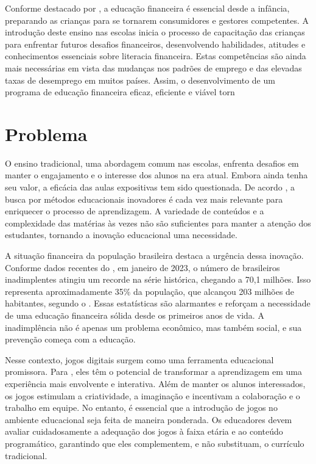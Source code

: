 Conforme destacado por \cite{masnan2016financial}, a educação financeira é essencial desde a infância, preparando as crianças para se tornarem consumidores e gestores competentes. A introdução deste ensino nas escolas inicia o processo de capacitação das crianças para enfrentar futuros desafios financeiros, desenvolvendo habilidades, atitudes e conhecimentos essenciais sobre literacia financeira. Estas competências são ainda mais necessárias em vista das mudanças nos padrões de emprego e das elevadas taxas de desemprego em muitos países. Assim, o desenvolvimento de um programa de educação financeira eficaz, eficiente e viável torn


\section{Problema}

O ensino tradicional, uma abordagem comum nas escolas, enfrenta desafios em manter o engajamento e o interesse dos alunos na era atual. Embora ainda tenha seu valor, a eficácia das aulas expositivas tem sido questionada. De acordo \cite{fortes2023aprendizagem}, a busca por métodos educacionais inovadores é cada vez mais relevante para enriquecer o processo de aprendizagem. A variedade de conteúdos e a complexidade das matérias às vezes não são suficientes para manter a atenção dos estudantes, tornando a inovação educacional uma necessidade.

A situação financeira da população brasileira destaca a urgência dessa inovação. Conforme dados recentes do \cite{SERASA_2023}, em janeiro de 2023, o número de brasileiros inadimplentes atingiu um recorde na série histórica, chegando a 70,1 milhões. Isso representa aproximadamente 35\% da população, que alcançou 203 milhões de habitantes, segundo o \cite{IBGE_Censo_2022}. Essas estatísticas são alarmantes e reforçam a necessidade de uma educação financeira sólida desde os primeiros anos de vida. A inadimplência não é apenas um problema econômico, mas também social, e sua prevenção começa com a educação.


Nesse contexto, jogos digitais surgem como uma ferramenta educacional promissora. Para \cite{Cruz_Araujo_Andrye_Galvao_Madeira_2022}, eles têm o potencial de transformar a aprendizagem em uma experiência mais envolvente e interativa. Além de manter os alunos interessados, os jogos estimulam a criatividade, a imaginação e incentivam a colaboração e o trabalho em equipe. No entanto, é essencial que a introdução de jogos no ambiente educacional seja feita de maneira ponderada. Os educadores devem avaliar cuidadosamente a adequação dos jogos à faixa etária e ao conteúdo programático, garantindo que eles complementem, e não substituam, o currículo tradicional.

